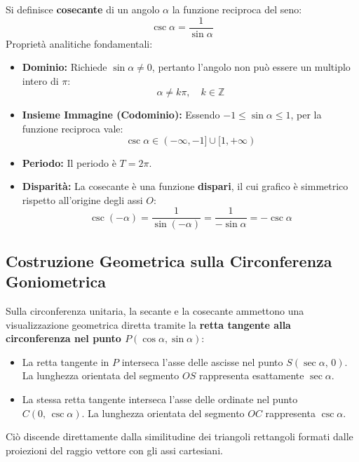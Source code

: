 \documentclass[11pt,a4paper,oneside]{report}
\begin{document}
\begin{definizione}
Si definisce \textbf{cosecante} di un angolo $\alpha$ la funzione reciproca del seno:
\begin{equation}
    \csc\alpha = \frac{1}{\sin\alpha}
\end{equation}
Propriet\`a analitiche fondamentali:
\begin{itemize}[leftmargin=2em]
    \item \textbf{Dominio:} Richiede $\sin\alpha \neq 0$, pertanto l'angolo non pu\`o essere un multiplo intero di $\pi$:
    \begin{equation}
        \alpha \neq k\pi, \quad k \in \mathbb{Z}
    \end{equation}
    \item \textbf{Insieme Immagine (Codominio):} Essendo $-1 \le \sin\alpha \le 1$, per la funzione reciproca vale:
    \begin{equation}
        \csc\alpha \in (-\infty, -1] \cup [1, +\infty)
    \end{equation}
    \item \textbf{Periodo:} Il periodo \`e $T = 2\pi$.
    \item \textbf{Disparit\`a:} La cosecante \`e una funzione \textbf{dispari}, il cui grafico \`e simmetrico rispetto all'origine degli assi $O$:
    \begin{equation}
        \csc(-\alpha) = \frac{1}{\sin(-\alpha)} = \frac{1}{-\sin\alpha} = -\csc\alpha
    \end{equation}
\end{itemize}
\end{definizione}

\subsection*{Costruzione Geometrica sulla Circonferenza Goniometrica}
Sulla circonferenza unitaria, la secante e la cosecante ammettono una visualizzazione geometrica diretta tramite la \textbf{retta tangente alla circonferenza nel punto $P(\cos\alpha, \sin\alpha)$}:
\begin{itemize}[leftmargin=2em]
    \item La retta tangente in $P$ interseca l'asse delle ascisse nel punto $S(\sec\alpha, \, 0)$. La lunghezza orientata del segmento $OS$ rappresenta esattamente $\sec\alpha$.
    \item La stessa retta tangente interseca l'asse delle ordinate nel punto $C(0, \, \csc\alpha)$. La lunghezza orientata del segmento $OC$ rappresenta $\csc\alpha$.
\end{itemize}
Ci\`o discende direttamente dalla similitudine dei triangoli rettangoli formati dalle proiezioni del raggio vettore con gli assi cartesiani.
\end{document}
